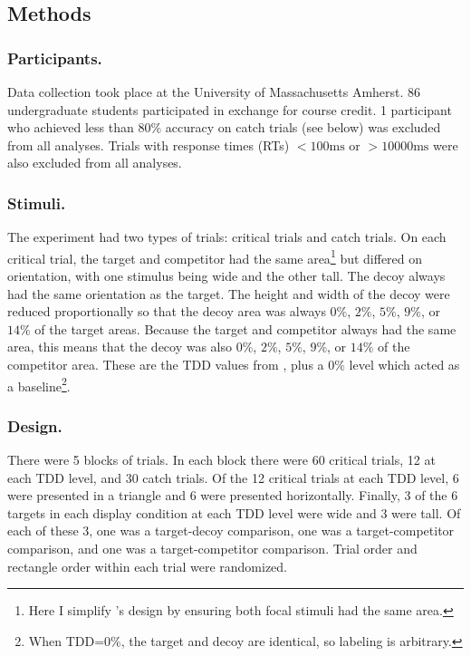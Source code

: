 {{\subsection{Methods}

\subsubsection{Participants.}
Data collection took place at the University of Massachusetts Amherst. 86 undergraduate students participated in exchange for course credit. 1 participant who achieved less than $80\%$ accuracy on catch trials (see below) was excluded from all analyses. Trials with response times (RTs) $<100\text{ms}$ or  $>10000\text{ms}$ were also excluded from all analyses.

\subsubsection{Stimuli.}
The experiment had two types of trials: critical trials and catch trials. 
On each critical trial, the target and competitor had the same area\footnote{Here I simplify \textcite{spektorWhenGoodLooks2018b}'s design by ensuring both focal stimuli had the same area.} but differed on orientation, with one stimulus being wide and the other tall. The decoy always had the same orientation as the target. The height and width of the decoy were reduced proportionally so that the decoy area was always $0\%$, $2\%$, $5\%$, $9\%$, or $14\%$ of the target areas. Because the target and competitor always had the same area, this means that the decoy was also $0\%$, $2\%$, $5\%$, $9\%$, or $14\%$ of the competitor area. These are the TDD values from \textcite{spektorWhenGoodLooks2018b}, plus a $0\%$ level which acted as a baseline\footnote{When TDD=$0\%$, the target and decoy are identical, so labeling is arbitrary.}.

\subsubsection{Design.}
There were 5 blocks of trials. In each block there were 60 critical trials, 12 at each TDD level, and 30 catch trials. Of the 12 critical trials at each TDD level, 6 were presented in a triangle and 6 were presented horizontally. Finally, 3 of the 6 targets in each display condition at each TDD level were wide and 3 were tall. Of each of these 3, one was a target-decoy comparison, one was a target-competitor comparison, and one was a target-competitor comparison. Trial order and rectangle order within each trial were randomized.

}}
